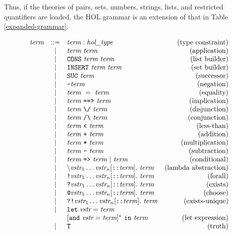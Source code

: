 \documentclass[12pt,fleqn,a4paper]{report}
\makeatletter
\newcommand{\vstr}       {\mbox{\it vstr}}
\newcommand{\type}       {\mbox{\it hol\_type}}
\newcommand{\term}       {\mbox{\it term}}
\newcommand{\bs}         {\mbox{$\backslash$}}
\newcommand{\SUC}       {\mbox{\tt SUC}}
\newcommand{\CONS}       {\mbox{\tt CONS}}
\newcommand{\INSERT}    {\mbox{\tt INSERT}}
\newcommand{\IMP}       {\mbox{\tt ==>}}
\newcommand{\LET}       {\mbox{\tt let}}
\newcommand{\IN}       {\mbox{\tt in}}
\newcommand{\und}       {\mbox{\tt and}}
\newcommand{\ALL}       {\mbox{\tt !}}
\newcommand{\EXISTS}       {\mbox{\tt ?}}
\newcommand{\EXISTSONE}       {\mbox{\tt ?!}}
\newcommand{\CHOOSE}       {\mbox{\tt @}}
\makeatother
\begin{document}
Thus, if the theories of pairs, sets, numbers, strings, lists, and
restricted quantifiers are loaded, the HOL grammar is an extension of
that in Table \ref{expanded-grammar}.
 \begin{table}
 \[
 \begin{array}{rclr}
  \term & ::= & \term : \type & \mbox{(type constraint)} \\
  & | & \term\ \term & \mbox{(application)} \\
  & | & \CONS\ \term \ \term & \mbox{(list builder)} \\
  & | & \INSERT\ \term \ \term & \mbox{(set builder)} \\
  & | & \SUC\ \term & \mbox{(successor)} \\
  & | & \verb+~+ \term & \mbox{(negation)} \\
  & | & \term\ =\ \term & \mbox{(equality)} \\
  & | & \term\ \IMP\ \term & \mbox{(implication)} \\
  & | & \term\ \verb+\/+\ \term & \mbox{(disjunction)} \\
  & | & \term\ \verb+/\+\ \term & \mbox{(conjunction)} \\
  & | & \term\ \verb+<+ \ \term & \mbox{(less-than)} \\
  & | & \term\ \verb!+! \ \term & \mbox{(addition)} \\
  & | & \term\ \verb!*! \ \term & \mbox{(multiplication)} \\
  & | & \term\ \verb!-! \ \term & \mbox{(subtraction)} \\
  & | & \term\ \verb+=>+\ \term\ |\ \term & \mbox{(conditional)} \\
  & | & \bs\vstr_1\ldots\vstr_n[\verb+::+\term].\ \term & \mbox{(lambda abstraction)} \\
  & | & \ALL \vstr_1\ldots\vstr_n[\verb+::+\term].\ \term & \mbox{(forall)} \\
  & | & \EXISTS \vstr_1\ldots\vstr_n[\verb+::+\term].\ \term & \mbox{(exists)} \\
  & | & \CHOOSE \vstr_1\ldots\vstr_n[\verb+::+\term].\ \term & \mbox{(choose)} \\
  & | & \EXISTSONE \vstr_1\ldots\vstr_n[\verb+::+\term].\ \term &\mbox{(exists-unique)} \\
  & | & \LET\; \vstr = \term  & \\
  &   & [\und\ \vstr = \term]^{*}\ \IN\ \term & \mbox{(let expression)} \\
  & | & \verb+T+ & \mbox{(truth)} \\

\end{array}\]
\end{table}
\end{document}
